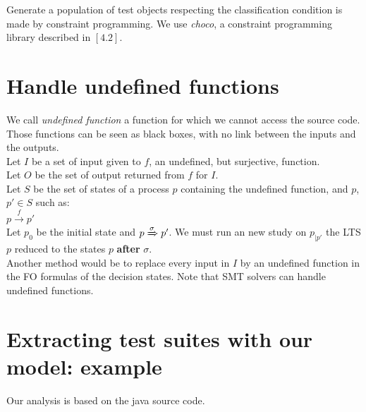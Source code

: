 \documentclass[a4paper]{report}
\begin{document}
Generate a population of test objects respecting the classification condition is made by constraint programming. We use \textit{choco}, a constraint programming library described in $[4.2]$.\\

\section*{Handle undefined functions}
We call \textit{undefined function} a function for which we cannot access the source code. Those functions can be seen as black boxes, with no link between the inputs and the outputs.\\
Let $I$ be a set of input given to $f$, an undefined, but surjective, function.\\
Let $O$ be the set of output returned from $f$ for $I$.\\
Let $S$ be the set of states of a process $p$ containing the undefined function, and $p$, $p' \in S$ such as:\\
$p \xrightarrow{f} p'$\\
Let $p_0$ be the initial state and $p \xRightarrow{\sigma} p'$.
We must run an new study on $p_{\mid p'}$ the LTS $p$ reduced to the states $p$ \textbf{after} $\sigma$.\\
 Another method would be to replace every input in $I$ by an undefined function in the FO formulas of the decision states. Note that SMT solvers can handle undefined functions.




\section*{Extracting test suites with our model: example}

Our analysis is based on the java source code.\\
\end{document}
